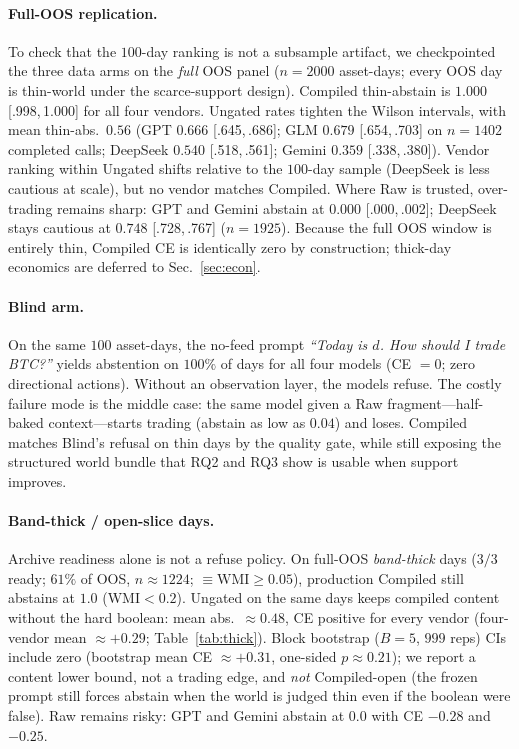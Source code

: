 \documentclass[sigconf,anonymous]{acmart}
\theoremstyle{acmdefinition}%
\theoremstyle{acmplain}%
\begin{document}
\paragraph{Full-OOS replication.}
To check that the \(100\)-day ranking is not a subsample artifact, we checkpointed the three data arms on the \emph{full} OOS panel (\(n{=}2000\) asset-days; every OOS day is thin-world under the scarce-support design). Compiled thin-abstain is \(1.000\) {\scriptsize[.998,\,1.000]} for all four vendors. Ungated rates tighten the Wilson intervals, with mean thin-abs.\ \(0.56\) (GPT \(0.666\) {\scriptsize[.645,\,.686]}; GLM \(0.679\) {\scriptsize[.654,\,.703]} on \(n{=}1402\) completed calls; DeepSeek \(0.540\) {\scriptsize[.518,\,.561]}; Gemini \(0.359\) {\scriptsize[.338,\,.380]}). Vendor ranking within Ungated shifts relative to the \(100\)-day sample (DeepSeek is less cautious at scale), but no vendor matches Compiled. Where Raw is trusted, over-trading remains sharp: GPT and Gemini abstain at \(0.000\) {\scriptsize[.000,\,.002]}; DeepSeek stays cautious at \(0.748\) {\scriptsize[.728,\,.767]} (\(n{=}1925\)). Because the full OOS window is entirely thin, Compiled CE is identically zero by construction; thick-day economics are deferred to Sec.~\ref{sec:econ}.

\paragraph{Blind arm.}
On the same \(100\) asset-days, the no-feed prompt \emph{``Today is \(d\). How should I trade BTC?''} yields abstention on \(100\%\) of days for all four models (CE \(=0\); zero directional actions). Without an observation layer, the models refuse. The costly failure mode is the middle case: the same model given a Raw fragment---half-baked context---starts trading (abstain as low as \(0.04\)) and loses. Compiled matches Blind's refusal on thin days by the quality gate, while still exposing the structured world bundle that RQ2 and RQ3 show is usable when support improves.

\paragraph{Band-thick / open-slice days.}
Archive readiness alone is not a refuse policy. On full-OOS \emph{band-thick} days (\(3/3\) ready; \(61\%\) of OOS, \(n{\approx}1224\); \(\equiv\mathrm{WMI}\ge 0.05\)), production Compiled still abstains at \(1.0\) (WMI\({<}0.2\)).
Ungated on the same days keeps compiled content without the hard boolean: mean abs.\ \({\approx}0.48\), CE positive for every vendor (four-vendor mean \({\approx}{+}0.29\); Table~\ref{tab:thick}).
Block bootstrap (\(B{=}5\), \(999\) reps) CIs include zero (bootstrap mean CE \({\approx}{+}0.31\), one-sided \(p{\approx}0.21\)); we report a content lower bound, not a trading edge, and \emph{not} Compiled-open (the frozen prompt still forces abstain when the world is judged thin even if the boolean were false).
Raw remains risky: GPT and Gemini abstain at \(0.0\) with CE \(-0.28\) and \(-0.25\).
\end{document}
